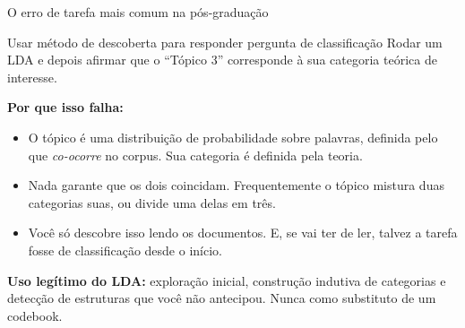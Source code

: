 \documentclass[11pt,aspectratio=169]{beamer}
\begin{document}
\begin{frame}{O erro de tarefa mais comum na pós-graduação}
\begin{alertblock}{Usar método de descoberta para responder pergunta de classificação}
Rodar um LDA e depois afirmar que o ``Tópico 3'' corresponde à sua categoria
teórica de interesse.
\end{alertblock}
\vspace{0.3cm}
\textbf{Por que isso falha:}
\begin{itemize}\small
  \item O tópico é uma distribuição de probabilidade sobre palavras, definida
        pelo que \emph{co-ocorre} no corpus. Sua categoria é definida pela
        teoria.
  \item Nada garante que os dois coincidam. Frequentemente o tópico mistura duas
        categorias suas, ou divide uma delas em três.
  \item Você só descobre isso lendo os documentos. E, se vai ter de ler, talvez
        a tarefa fosse de classificação desde o início.
\end{itemize}
\pause
\vspace{0.25cm}
\small \textbf{Uso legítimo do LDA:} exploração inicial, construção indutiva de
categorias e detecção de estruturas que você não antecipou. Nunca como
substituto de um codebook.
\end{frame}
\end{document}
